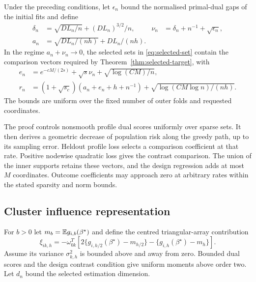 \begin{theorem}\label{thm:learning}
Under the preceding conditions, let $\epsilon_n$ bound the normalised
primal-dual gaps of the initial fits and define
\begin{align}
 \delta_n&=\sqrt{D L_n/n}+(D L_n)^{3/2}/n,
 &\nu_n&=\delta_n+n^{-1}+\sqrt{\epsilon_n},\nonumber\\
 a_n&=\sqrt{D L_n/(nh)}+D L_n/(nh).
 &&\label{eq:learning-fluctuations}
\end{align}
In the regime $a_n+\nu_n\to0$, the selected sets in
\eqref{eq:selected-set} contain the comparison
vectors required by Theorem~\ref{thm:selected-target}, with
\begin{align}
 e_n&=e^{-cM/(2s)}+\sqrt{s}\nu_n+
                              \sqrt{\log(CM)/n},\label{eq:outcome-rate}\\
 r_n&=(1+\sqrt{s_c})(a_n+e_n+h+n^{-1})
                  +\sqrt{\log(CM\log n)/(nh)}.\label{eq:contrast-rate}
\end{align}
The bounds are uniform over the fixed number of outer folds and
requested coordinates.
\end{theorem}

The proof controls nonsmooth profile dual scores uniformly over sparse
sets. It then derives a geometric decrease of population risk along
the greedy path, up to its sampling error. Heldout profile loss selects
a comparison coefficient at that rate. Positive nodewise quadratic
loss gives the contrast comparison. The union of the inner supports
retains these vectors, and the design regression adds at most $M$
coordinates. Outcome coefficients may approach zero at arbitrary
rates within the stated sparsity and norm bounds.

\subsection{Cluster influence representation}\label{subsec:bahadur}

For $b>0$ let $m_b=\mathbb{E} g_{i,b}(\beta^\star)$ and define the centred
triangular-array contribution
\begin{equation}\label{eq:influence}
 \xi_{ik,h}=-\omega_{0k}^T
       [2\{g_{i,h/2}(\beta^\star)-m_{h/2}\}
                         -\{g_{i,h}(\beta^\star)-m_h\}].
\end{equation}
Assume its variance $\sigma_{k,h}^2$ is bounded above and away from
zero. Bounded dual scores and the design contrast condition give
uniform moments above order two. Let $d_n$ bound the selected
estimation dimension.

